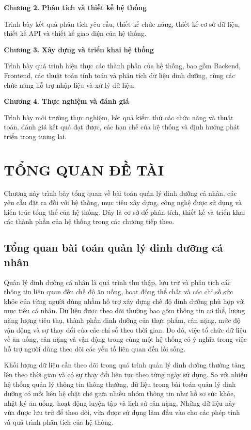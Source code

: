 \documentclass[12pt, a4paper]{report}
\begin{document}
\textbf{Chương 2. Phân tích và thiết kế hệ thống}

Trình bày kết quả phân tích yêu cầu, thiết kế chức năng, thiết kế cơ sở dữ liệu, thiết kế API và thiết kế giao diện của hệ thống.

\textbf{Chương 3. Xây dựng và triển khai hệ thống}

Trình bày quá trình hiện thực các thành phần của hệ thống, bao gồm Backend, Frontend, các thuật toán tính toán và phân tích dữ liệu dinh dưỡng, cùng các chức năng hỗ trợ nhập liệu và xử lý dữ liệu.

\textbf{Chương 4. Thực nghiệm và đánh giá}

Trình bày môi trường thực nghiệm, kết quả kiểm thử các chức năng và thuật toán, đánh giá kết quả đạt được, các hạn chế của hệ thống và định hướng phát triển trong tương lai.


\chapter{TỔNG QUAN ĐỀ TÀI}
Chương này trình bày tổng quan về bài toán quản lý dinh dưỡng cá nhân, các yêu cầu đặt ra đối với hệ thống, mục tiêu xây dựng, công nghệ được sử dụng và kiến trúc tổng thể của hệ thống. Đây là cơ sở để phân tích, thiết kế và triển khai các thành phần của hệ thống trong các chương tiếp theo.

\section{Tổng quan bài toán quản lý dinh dưỡng cá nhân}Quản lý dinh dưỡng cá nhân là quá trình thu thập, lưu trữ và phân tích các thông tin liên quan đến chế độ ăn uống, hoạt động thể chất và các chỉ số sức khỏe của từng người dùng nhằm hỗ trợ xây dựng chế độ dinh dưỡng phù hợp với mục tiêu cá nhân. Dữ liệu được theo dõi thường bao gồm thông tin cơ thể, lượng năng lượng tiêu thụ, thành phần dinh dưỡng của thực phẩm, cân nặng, mức độ vận động và sự thay đổi của các chỉ số theo thời gian. Do đó, việc tổ chức dữ liệu về ăn uống, cân nặng và vận động trong cùng một hệ thống có ý nghĩa trong việc hỗ trợ người dùng theo dõi các yếu tố liên quan đến lối sống.

Khối lượng dữ liệu cần theo dõi trong quá trình quản lý dinh dưỡng thường tăng lên theo thời gian và có sự thay đổi liên tục theo từng ngày sử dụng. So với nhiều hệ thống quản lý thông tin thông thường, dữ liệu trong bài toán quản lý dinh dưỡng có mối liên hệ chặt chẽ giữa nhiều nhóm thông tin như hồ sơ sức khỏe, nhật ký ăn uống, hoạt động luyện tập và lịch sử cân nặng. Những dữ liệu này vừa được lưu trữ để theo dõi, vừa được sử dụng làm đầu vào cho các phép tính và quá trình phân tích của hệ thống.
\end{document}
